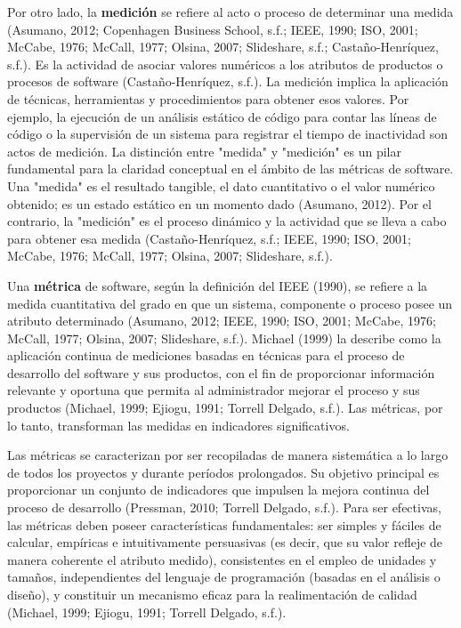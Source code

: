 \documentclass[11pt]{article}
\begin{document}
Por otro lado, la \textbf{medición} se refiere al acto o proceso de determinar una medida (Asumano, 2012; Copenhagen Business School, s.f.; IEEE, 1990; ISO, 2001; McCabe, 1976; McCall, 1977; Olsina, 2007; Slideshare, s.f.; Castaño-Henríquez, s.f.). Es la actividad de asociar valores numéricos a los atributos de productos o procesos de software (Castaño-Henríquez, s.f.). La medición implica la aplicación de técnicas, herramientas y procedimientos para obtener esos valores. Por ejemplo, la ejecución de un análisis estático de código para contar las líneas de código o la supervisión de un sistema para registrar el tiempo de inactividad son actos de medición. La distinción entre "medida" y "medición" es un pilar fundamental para la claridad conceptual en el ámbito de las métricas de software. Una "medida" es el resultado tangible, el dato cuantitativo o el valor numérico obtenido; es un estado estático en un momento dado (Asumano, 2012). Por el contrario, la "medición" es el proceso dinámico y la actividad que se lleva a cabo para obtener esa medida (Castaño-Henríquez, s.f.; IEEE, 1990; ISO, 2001; McCabe, 1976; McCall, 1977; Olsina, 2007; Slideshare, s.f.).

Una \textbf{métrica} de software, según la definición del IEEE (1990), se refiere a la medida cuantitativa del grado en que un sistema, componente o proceso posee un atributo determinado (Asumano, 2012; IEEE, 1990; ISO, 2001; McCabe, 1976; McCall, 1977; Olsina, 2007; Slideshare, s.f.). Michael (1999) la describe como la aplicación continua de mediciones basadas en técnicas para el proceso de desarrollo del software y sus productos, con el fin de proporcionar información relevante y oportuna que permita al administrador mejorar el proceso y sus productos (Michael, 1999; Ejiogu, 1991; Torrell Delgado, s.f.). Las métricas, por lo tanto, transforman las medidas en indicadores significativos.

Las métricas se caracterizan por ser recopiladas de manera sistemática a lo largo de todos los proyectos y durante períodos prolongados. Su objetivo principal es proporcionar un conjunto de indicadores que impulsen la mejora continua del proceso de desarrollo (Pressman, 2010; Torrell Delgado, s.f.). Para ser efectivas, las métricas deben poseer características fundamentales: ser simples y fáciles de calcular, empíricas e intuitivamente persuasivas (es decir, que su valor refleje de manera coherente el atributo medido), consistentes en el empleo de unidades y tamaños, independientes del lenguaje de programación (basadas en el análisis o diseño), y constituir un mecanismo eficaz para la realimentación de calidad (Michael, 1999; Ejiogu, 1991; Torrell Delgado, s.f.).
\end{document}
